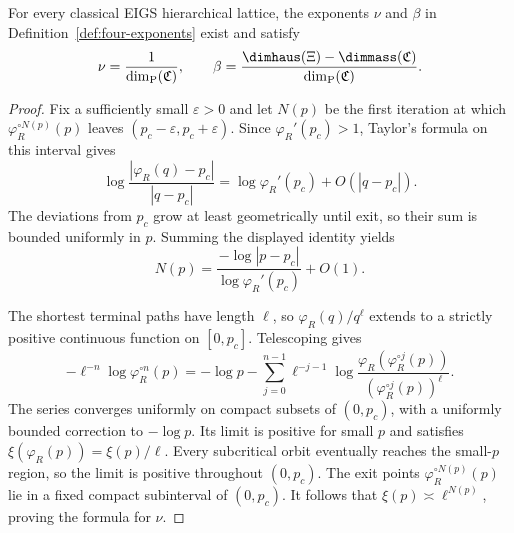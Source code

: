 \begin{theorem}\label{thm:critical-exponents-dimensions}
For every classical EIGS hierarchical lattice, the exponents $\nu$ and $\beta$ in Definition~\ref{def:four-exponents} exist and satisfy
\[
 \nu=\frac1{\dim_{\mathrm P}(\mathfrak C)},
 \qquad
 \beta=\frac{\dimhaus(\Xi)-\dimmass(\mathfrak C)}{\dim_{\mathrm P}(\mathfrak C)}.
\]
\end{theorem}
\begin{proof}
Fix a sufficiently small $\varepsilon>0$ and let $N(p)$ be the first iteration at which $\varphi_R^{\circ N(p)}(p)$ leaves $(p_c-\varepsilon,p_c+\varepsilon)$.
Since $\varphi_R'(p_c)>1$, Taylor's formula on this interval gives
\[
 \log\frac{|\varphi_R(q)-p_c|}{|q-p_c|}
 =\log\varphi_R'(p_c)+O(|q-p_c|).
\]
The deviations from $p_c$ grow at least geometrically until exit, so their sum is bounded uniformly in $p$.
Summing the displayed identity yields
\begin{equation}\label{eq:critical-escape-time}
 N(p)=\frac{-\log|p-p_c|}{\log\varphi_R'(p_c)}+O(1).
\end{equation}

The shortest terminal paths have length $\ell$, so $\varphi_R(q)/q^\ell$ extends to a strictly positive continuous function on $[0,p_c]$.
Telescoping gives
\[
 -\ell^{-n}\log\varphi_R^{\circ n}(p)
 =-\log p-\sum_{j=0}^{n-1}\ell^{-j-1}
 \log\frac{\varphi_R(\varphi_R^{\circ j}(p))}
 {(\varphi_R^{\circ j}(p))^\ell}.
\]
The series converges uniformly on compact subsets of $(0,p_c)$, with a uniformly bounded correction to $-\log p$.
Its limit is positive for small $p$ and satisfies $\xi(\varphi_R(p))=\xi(p)/\ell$.
Every subcritical orbit eventually reaches the small-$p$ region, so the limit is positive throughout $(0,p_c)$.
The exit points $\varphi_R^{\circ N(p)}(p)$ lie in a fixed compact subinterval of $(0,p_c)$.
It follows that $\xi(p)\asymp\ell^{N(p)}$, proving the formula for $\nu$.


\end{proof}
